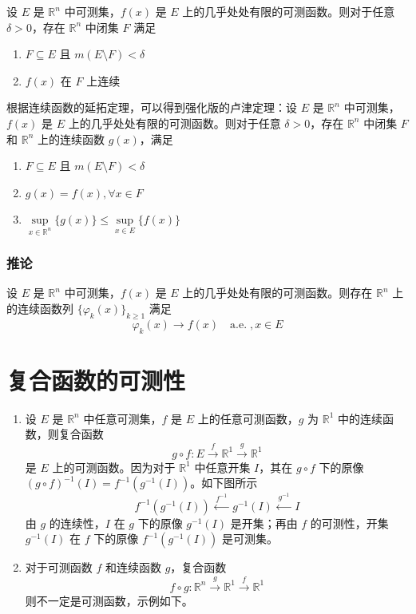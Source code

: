 \documentclass{ctexbook}
\newcommand{\no}{\noindent}
\newcommand{\R}{\mathbb{R}}
\newcommand{\nae}{\mathrm{\quad a.e.\; }}
\newcommand{\ITEMS}{\begin{enumerate}[leftmargin=4em]}
\newcommand{\ITEME}{\end{enumerate}}
\begin{document}
设 $E$ 是 $\R^n$ 中可测集，$f(x)$ 是 $E$ 上的几乎处处有限的可测函数。则对于任意 $\delta > 0$，存在 $\R^n$ 中闭集 $F$ 满足
\ITEMS
\item $F\subseteq E$ 且 $m(E \setminus F) < \delta$
\item $f(x)$ 在 $F$ 上连续	
\ITEME


\no{\bf 注：}

根据连续函数的延拓定理，可以得到强化版的卢津定理：设 $E$ 是 $\R^n$ 中可测集，$f(x)$ 是 $E$ 上的几乎处处有限的可测函数。则对于任意 $\delta > 0$，存在 $\R^n$ 中闭集 $F$ 和 $\R^n$ 上的连续函数 $g(x)$，满足
\ITEMS
\item $F\subseteq E$ 且 $m(E \setminus F) < \delta$
\item $g(x) = f(x), \forall x \in F$	
\item $\sup\limits_{x\in \R^n} \{g(x)\} \le \sup\limits_{x\in E} \{f(x)\}$
\ITEME

\subsubsection{推论}

设 $E$ 是 $\R^n$ 中可测集，$f(x)$ 是 $E$ 上的几乎处处有限的可测函数。则存在 $\R^n$ 上的连续函数列 $\{\varphi_k(x)\}_{k\ge 1}$ 满足
\[
\varphi_k(x) \to f(x) \nae, x \in E
\]

\section{复合函数的可测性}

\ITEMS
\item  设 $E$ 是 $\R^n$ 中任意可测集，$f$ 是 $E$ 上的任意可测函数，$g$ 为 $\R^1$ 中的连续函数，则复合函数
\[
g\circ f: E \xrightarrow{\;f\;} \R^1\xrightarrow{\;g\;} \R^1
\]
是 $E$ 上的可测函数。因为对于 $\R^1$ 中任意开集 $I$，其在 $g\circ f$ 下的原像 $(g\circ f)^{-1}(I)=f^{-1}(g^{-1}(I))$。如下图所示 
\[
f^{-1}(g^{-1}(I)) \xleftarrow{\;f^{-1}\;} g^{-1}(I) \xleftarrow{\;g^{-1}\;} I
\]
由 $g$ 的连续性，$I$ 在 $g$ 下的原像 $g^{-1}(I)$ 是开集；再由 $f$ 的可测性，开集 $g^{-1}(I)$ 在 $f$ 下的原像 $f^{-1}(g^{-1}(I))$ 是可测集。
\item 对于可测函数 $f$ 和连续函数 $g$，复合函数
\[
f\circ g: \R^n \xrightarrow{\;g\;} \R^1\xrightarrow{\;f\;} \R^1
\]
则不一定是可测函数，示例如下。
\ITEME 
\end{document}
